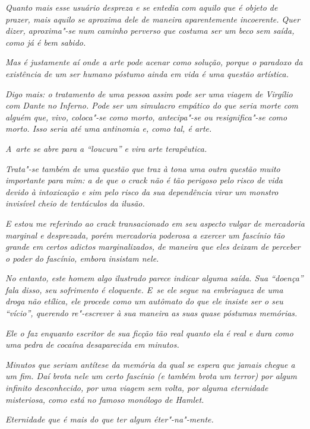 \emph{Quanto mais esse usuário despreza e se entedia com aquilo que é
objeto de prazer, mais aquilo se aproxima dele de maneira aparentemente
incoerente. Quer dizer, aproxima"-se num caminho perverso que costuma ser
um beco sem saída, como já é bem sabido.}~

\emph{Mas é justamente aí onde a arte pode acenar como solução, porque o
paradoxo da existência de um ser humano póstumo ainda em vida é uma
questão artística.}~

\emph{Digo mais: o tratamento de uma pessoa assim pode ser uma viagem de
Virgílio com Dante no Inferno. Pode ser um simulacro empático do que
seria morte com alguém que, vivo, coloca"-se como morto, antecipa"-se ou
resignifica"-se como morto. Isso seria até uma antinomia e, como tal, é
arte.}~

\emph{A~arte se abre para a ``loucura'' e vira arte terapêutica.}~

\emph{Trata"-se também de uma questão que traz à tona uma outra questão
muito importante para mim: a de que o crack não é tão perigoso pelo
risco de vida devido à intoxicação e sim pelo risco da sua dependência
virar um monstro invisível cheio de tentáculos da ilusão.}~

\emph{E estou me referindo ao crack transacionado em seu aspecto vulgar
de mercadoria marginal e desprezada, porém mercadoria poderosa a exercer
um fascínio tão grande em certos adictos marginalizados, de maneira que
eles deixam de perceber o poder do fascínio, embora insistam nele.}~

\emph{No entanto, este homem algo ilustrado parece indicar alguma saída.
Sua ``doença'' fala disso, seu sofrimento é eloquente. E~se ele segue na
embriaguez de uma droga não etílica, ele procede como um autômato do que
ele insiste ser o seu ``vício'', querendo re"-escrever à sua maneira as
suas quase póstumas memórias.}~

\emph{Ele o faz enquanto escritor de sua ficção tão real quanto ela é
real e dura como uma pedra de cocaína desaparecida em minutos.}~

\emph{Minutos que seriam antítese da memória da qual se espera que
jamais chegue a um fim. Daí brota nele um certo fascínio (e também brota
um terror) por algum infinito desconhecido, por uma viagem sem volta,
por alguma eternidade misteriosa, como está no famoso monólogo de
Hamlet.}~

\emph{Eternidade que é mais do que ter algum éter"-na"-mente.}
\endgroup
